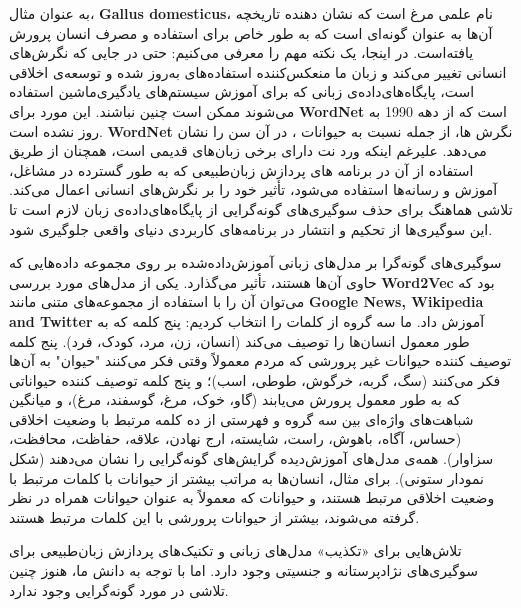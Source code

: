به عنوان مثال، \textenglish{\textbf{Gallus domesticus}}، نام علمی مرغ است که نشان دهنده تاریخچه آن‌ها به عنوان گونه‌ای است که به طور خاص برای استفاده و مصرف انسان پرورش یافته‌است.
در اینجا، یک نکته مهم را معرفی می‌کنیم: حتی در جایی که نگرش‌های انسانی تغییر می‌کند و زبان ما منعکس‌کننده استفاده‌های به‌روز شده و توسعه‌ی اخلاقی است، پایگاه‌های‌داده‌ی زبانی که برای آموزش سیستم‌های یادگیری‌ماشین استفاده می‌شوند ممکن است چنین نباشند.
این مورد برای \textenglish{\textbf{WordNet}} است که از دهه 1990 به روز نشده است.
\textenglish{\textbf{WordNet}} نگرش ها، از جمله نسبت به حیوانات ، در آن سن را نشان می‌دهد.
علیرغم اینکه ورد نت دارای برخی زبان‌های قدیمی است، همچنان از طریق استفاده از آن در برنامه های پردازش زبان‌طبیعی که به طور گسترده در مشاغل، آموزش و رسانه‌ها استفاده می‌شود، تأثیر خود را بر نگرش‌های انسانی اعمال می‌کند.
تلاشی هماهنگ برای حذف سوگیری‌های گونه‌گرایی از پایگاه‌های‌داده‌ی زبان لازم است تا این سوگیری‌ها از تحکیم و انتشار در برنامه‌های کاربردی دنیای واقعی جلوگیری شود.

سوگیری‌های گونه‌گرا بر مدل‌های زبانی آموزش‌داده‌شده بر روی مجموعه داده‌هایی که حاوی آن‌ها هستند، تأثیر می‌گذارد.
یکی از مدل‌های مورد بررسی \textenglish{\textbf{Word2Vec}} بود که می‌توان آن را با استفاده از مجموعه‌های متنی مانند \textenglish{\textbf{Google News, Wikipedia and Twitter}} آموزش داد.
ما سه گروه از کلمات را انتخاب کردیم: پنج کلمه که به طور معمول انسان‌ها را توصیف می‌کند (انسان، زن، مرد، کودک، فرد).
پنج کلمه توصیف کننده حیوانات غیر پرورشی که مردم معمولاً وقتی فکر می‌کنند "حیوان" به آن‌ها فکر می‌کنند (سگ، گربه، خرگوش، طوطی، اسب)؛ و پنج کلمه توصیف کننده حیواناتی که به طور معمول پرورش می‌یابند (گاو، خوک، مرغ، گوسفند، مرغ)، و میانگین شباهت‌های واژه‌ای بین سه گروه و فهرستی از ده کلمه مرتبط با وضعیت اخلاقی (حساس، آگاه، باهوش، راست، شایسته، ارج نهادن، علاقه، حفاظت، محافظت، سزاوار).
همه‌ی مدل‌های آموزش‌دیده گرایش‌های گونه‌گرایی را نشان می‌دهند (شکل نمودار ستونی).
برای مثال، انسان‌ها به مراتب بیشتر از حیوانات با کلمات مرتبط با وضعیت اخلاقی مرتبط هستند، و حیوانات که معمولاً به عنوان حیوانات همراه در نظر گرفته می‌شوند، بیشتر از حیوانات پرورشی با این کلمات مرتبط هستند.

تلاش‌هایی برای «تکذیب» مدل‌های زبانی و تکنیک‌های پردازش زبان‌طبیعی برای سوگیری‌های نژادپرستانه و جنسیتی وجود دارد.
اما با توجه به دانش ما، هنوز چنین تلاشی در مورد گونه‌گرایی وجود ندارد.
\newline
\newline


